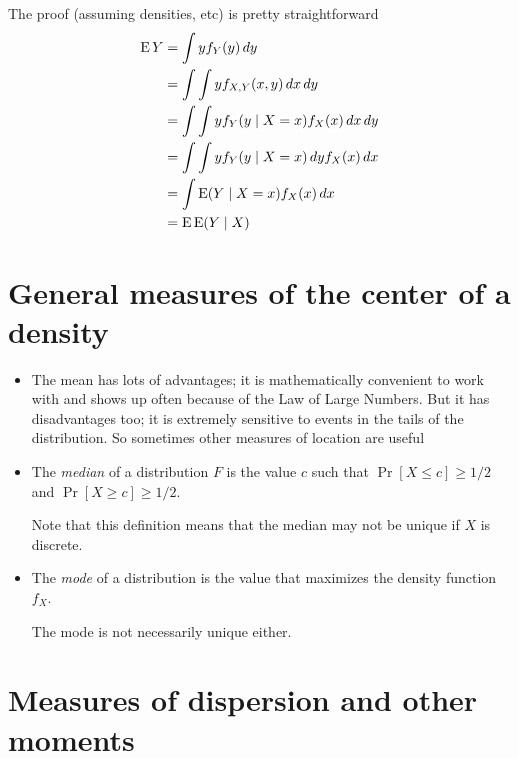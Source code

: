 \begin{itemize}[leftmargin=0pt]
\begin{enumerate}
\begin{thm}
    \end{thm}
    The proof (assuming densities, etc) is pretty straightforward
    \begin{align*}
      \operatorname{E} Y &= \int y f_Y(y) \,dy \\
      &= \int \int y f_{X,Y}(x,y) \,dx \,dy \\
      &= \int \int y f_Y(y \mid X = x) f_X(x) \,dx \,dy \\
      &= \int \int y f_Y(y \mid X = x) \,dy f_X(x) \,dx \\
      &= \int \operatorname{E}(Y \mid X = x) f_X(x) \,dx \\
      &= \operatorname{E} \operatorname{E}(Y \mid X)
    \end{align*}
  \end{enumerate}

\end{itemize}

\section{General measures of the center of a density}

\begin{itemize}[leftmargin=0pt]

\item The mean has lots of advantages; it is mathematically convenient
  to work with and shows up often because of the Law of Large Numbers.
  But it has disadvantages too; it is extremely sensitive to events in
  the tails of the distribution.  So sometimes other measures of
  location are useful

\item %
  \begin{defn}
    The \emph{median} of a distribution $F$ is the value $c$ such that
    $\Pr[X \leq c] \geq 1/2$ and $\Pr[X \geq c] \geq 1/2$.
  \end{defn}
  Note that this definition means that the median may not be unique if
  $X$ is discrete.

\item %
  \begin{defn}
    The \emph{mode} of a distribution is the value that maximizes
    the density function $f_X$.
  \end{defn}
  The mode is not necessarily unique either.

\end{itemize}

\section{Measures of dispersion and other moments}

